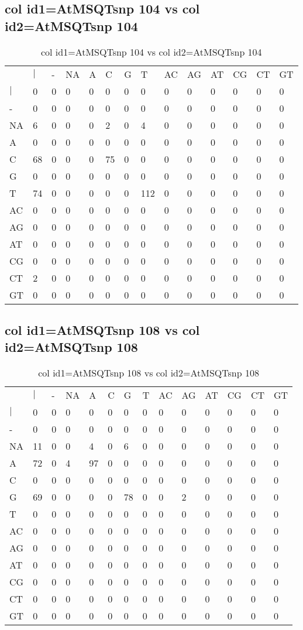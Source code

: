 \subsection{col id1=AtMSQTsnp 104 vs col id2=AtMSQTsnp 104}
\begin{center}
\begin{longtable}{|l|l|l|l|l|l|l|l|l|l|l|l|l|l|}
\caption{col id1=AtMSQTsnp 104 vs col id2=AtMSQTsnp 104} \label{table_dm694}\\
\hline
\\
\hline
&$|$&-&NA&A&C&G&T&AC&AG&AT&CG&CT&GT\\
$|$&0&0&0&0&0&0&0&0&0&0&0&0&0\\
-&0&0&0&0&0&0&0&0&0&0&0&0&0\\
NA&6&0&0&0&2&0&4&0&0&0&0&0&0\\
A&0&0&0&0&0&0&0&0&0&0&0&0&0\\
C&68&0&0&0&75&0&0&0&0&0&0&0&0\\
G&0&0&0&0&0&0&0&0&0&0&0&0&0\\
T&74&0&0&0&0&0&112&0&0&0&0&0&0\\
AC&0&0&0&0&0&0&0&0&0&0&0&0&0\\
AG&0&0&0&0&0&0&0&0&0&0&0&0&0\\
AT&0&0&0&0&0&0&0&0&0&0&0&0&0\\
CG&0&0&0&0&0&0&0&0&0&0&0&0&0\\
CT&2&0&0&0&0&0&0&0&0&0&0&0&0\\
GT&0&0&0&0&0&0&0&0&0&0&0&0&0\\
\hline
\end{longtable}
\end{center}

\subsection{col id1=AtMSQTsnp 108 vs col id2=AtMSQTsnp 108}
\begin{center}
\begin{longtable}{|l|l|l|l|l|l|l|l|l|l|l|l|l|l|}
\caption{col id1=AtMSQTsnp 108 vs col id2=AtMSQTsnp 108} \label{table_dm696}\\
\hline
\\
\hline
&$|$&-&NA&A&C&G&T&AC&AG&AT&CG&CT&GT\\
$|$&0&0&0&0&0&0&0&0&0&0&0&0&0\\
-&0&0&0&0&0&0&0&0&0&0&0&0&0\\
NA&11&0&0&4&0&6&0&0&0&0&0&0&0\\
A&72&0&4&97&0&0&0&0&0&0&0&0&0\\
C&0&0&0&0&0&0&0&0&0&0&0&0&0\\
G&69&0&0&0&0&78&0&0&2&0&0&0&0\\
T&0&0&0&0&0&0&0&0&0&0&0&0&0\\
AC&0&0&0&0&0&0&0&0&0&0&0&0&0\\
AG&0&0&0&0&0&0&0&0&0&0&0&0&0\\
AT&0&0&0&0&0&0&0&0&0&0&0&0&0\\
CG&0&0&0&0&0&0&0&0&0&0&0&0&0\\
CT&0&0&0&0&0&0&0&0&0&0&0&0&0\\
GT&0&0&0&0&0&0&0&0&0&0&0&0&0\\
\hline
\end{longtable}
\end{center}

